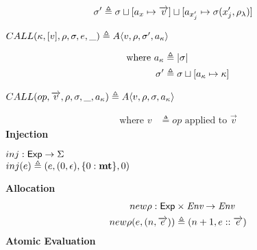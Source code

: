 \documentclass[12pt,draft]{article}
\newcommand{\A}[4]{A\langle #1 , #2 , #3 , #4 \rangle}
\begin{document}
\begin{multicols*}{2}
\begin{align*}
    \sigma' &\triangleq \sigma
               \sqcup [a_x \mapsto \overrightarrow{v}]
               \sqcup [a_{x_j'} \mapsto \sigma(x_j' , \rho_{\lambda})]
  \end{align*}
  \begin{center}
    $CALL(\kappa , [v] , \cenv , \cstore , e , \_)
           \triangleq \A{v}{\cenv}{\cstore'}{\ckaddr} $
  \end{center}
  \vspace{-7mm}
  \begin{align*}
    \text{where }
    a_{\kappa} &\triangleq |\sigma| \\
    \sigma' &\triangleq \sigma \sqcup [a_{\kappa} \mapsto \kappa]
  \end{align*}
  \begin{center}
    $CALL(op , \overrightarrow{v} , \cenv , \cstore , \_ , \ckaddr)
    \triangleq \A{v}{\cenv}{\cstore}{\ckaddr}$ \\
  \end{center}
  \vspace{-7mm}
  \begin{align*}
    \text{where }
    v &\triangleq op \text{ applied to } \overrightarrow{v}
  \end{align*}
  \vfill\null
  \columnbreak
  \noindent \textbf{Injection} \\
  \vspace{-7mm}
  \begin{center}
    $inj : \textsf{Exp} \rightarrow \Sigma$ \\
    $inj(e) \triangleq
    (e , (0 , \epsilon) , \{0 : \textbf{mt} \} , 0)$
  \end{center}
  \textbf{Allocation} \\
  \vspace{-3mm}
  \begin{align*}
    new\rho : \textsf{Exp} &\times \textit{Env} \rightarrow \textit{Env} \\
    new\rho(e , (n,\overrightarrow{e})) &\triangleq (n+1, e::\overrightarrow{e})
  \end{align*}
  \textbf{Atomic Evaluation} \\
  \vspace{-3mm}
  \begin{align*}

\end{align*}
\end{multicols*}
\end{document}
